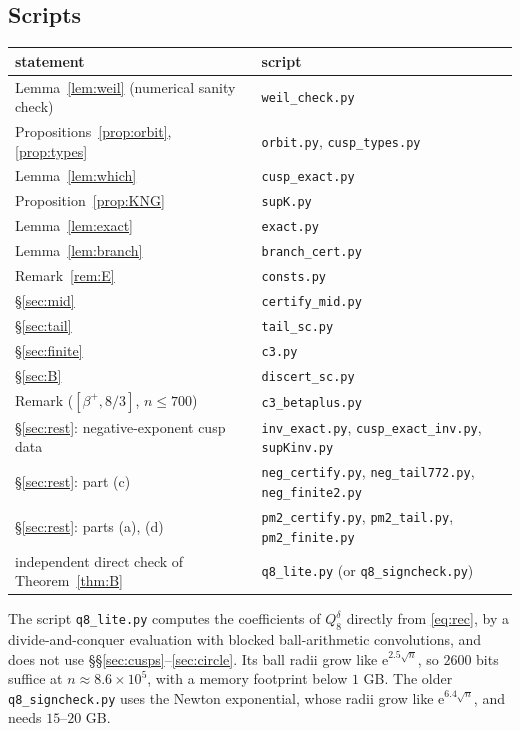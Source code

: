 \documentclass[11pt]{amsart}
\theoremstyle{remark}
\theoremstyle{definition}
\newcommand{\e}{\mathrm e}
\begin{document}
\subsection*{Scripts}
\begin{center}
\begin{tabular}{p{6.2cm}p{6.6cm}}
\toprule
statement & script\\
\midrule
Lemma~\ref{lem:weil} (numerical sanity check) & \texttt{weil\_check.py}\\
Propositions~\ref{prop:orbit}, \ref{prop:types} & \texttt{orbit.py}, \texttt{cusp\_types.py}\\
Lemma~\ref{lem:which} & \texttt{cusp\_exact.py}\\
Proposition~\ref{prop:KNG} & \texttt{supK.py}\\
Lemma~\ref{lem:exact} & \texttt{exact.py}\\
Lemma~\ref{lem:branch} & \texttt{branch\_cert.py}\\
Remark~\ref{rem:E} & \texttt{consts.py}\\
\S\ref{sec:mid} & \texttt{certify\_mid.py}\\
\S\ref{sec:tail} & \texttt{tail\_sc.py}\\
\S\ref{sec:finite} & \texttt{c3.py}\\
\S\ref{sec:B} & \texttt{discert\_sc.py}\\
Remark ($[\beta^+,8/3]$, $n\le700$) & \texttt{c3\_betaplus.py}\\
\S\ref{sec:rest}: negative-exponent cusp data & \texttt{inv\_exact.py}, \texttt{cusp\_exact\_inv.py}, \newline \texttt{supKinv.py}\\
\S\ref{sec:rest}: part (c) & \texttt{neg\_certify.py}, \texttt{neg\_tail772.py}, \texttt{neg\_finite2.py}\\
\S\ref{sec:rest}: parts (a), (d) & \texttt{pm2\_certify.py}, \texttt{pm2\_tail.py}, \texttt{pm2\_finite.py}\\
independent direct check of Theorem~\ref{thm:B} & \texttt{q8\_lite.py} (or \texttt{q8\_signcheck.py})\\
\bottomrule
\end{tabular}
\end{center}
The script \texttt{q8\_lite.py} computes the coefficients of $Q_8^\delta$ directly from \eqref{eq:rec}, by a divide-and-conquer evaluation with blocked ball-arithmetic convolutions, and does not use \S\S\ref{sec:cusps}--\ref{sec:circle}. Its ball radii grow like $\e^{2.5\sqrt n}$, so $2600$ bits suffice at $n\approx8.6\times10^5$, with a memory footprint below $1$ GB. The older \texttt{q8\_signcheck.py} uses the Newton exponential, whose radii grow like $\e^{6.4\sqrt n}$, and needs $15$--$20$ GB.
\end{document}
